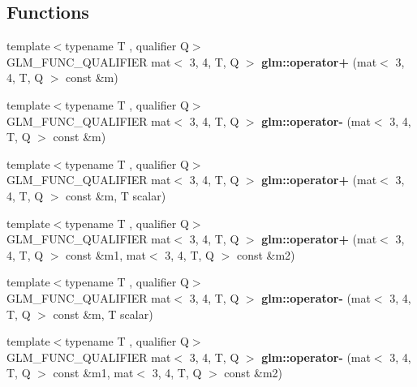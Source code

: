 \subsection*{Functions}
\begin{DoxyCompactItemize}
\item 
\mbox{\label{type__mat3x4_8inl_a80a5567c9ecbbec46155bf07f9d89ac8}} 
{\footnotesize template$<$typename T , qualifier Q$>$ }\\G\+L\+M\+\_\+\+F\+U\+N\+C\+\_\+\+Q\+U\+A\+L\+I\+F\+I\+ER mat$<$ 3, 4, T, Q $>$ {\bfseries glm\+::operator+} (mat$<$ 3, 4, T, Q $>$ const \&m)
\item 
\mbox{\label{type__mat3x4_8inl_a79b94b30ab64f9fb5d7b6ebdaf29adab}} 
{\footnotesize template$<$typename T , qualifier Q$>$ }\\G\+L\+M\+\_\+\+F\+U\+N\+C\+\_\+\+Q\+U\+A\+L\+I\+F\+I\+ER mat$<$ 3, 4, T, Q $>$ {\bfseries glm\+::operator-\/} (mat$<$ 3, 4, T, Q $>$ const \&m)
\item 
\mbox{\label{type__mat3x4_8inl_a1a8b82f43c87f6cfba909facca9c04b7}} 
{\footnotesize template$<$typename T , qualifier Q$>$ }\\G\+L\+M\+\_\+\+F\+U\+N\+C\+\_\+\+Q\+U\+A\+L\+I\+F\+I\+ER mat$<$ 3, 4, T, Q $>$ {\bfseries glm\+::operator+} (mat$<$ 3, 4, T, Q $>$ const \&m, T scalar)
\item 
\mbox{\label{type__mat3x4_8inl_a59ca098cc308f717e9036bbfd62de33f}} 
{\footnotesize template$<$typename T , qualifier Q$>$ }\\G\+L\+M\+\_\+\+F\+U\+N\+C\+\_\+\+Q\+U\+A\+L\+I\+F\+I\+ER mat$<$ 3, 4, T, Q $>$ {\bfseries glm\+::operator+} (mat$<$ 3, 4, T, Q $>$ const \&m1, mat$<$ 3, 4, T, Q $>$ const \&m2)
\item 
\mbox{\label{type__mat3x4_8inl_abd4b7d952364922e319f2c3240a6f799}} 
{\footnotesize template$<$typename T , qualifier Q$>$ }\\G\+L\+M\+\_\+\+F\+U\+N\+C\+\_\+\+Q\+U\+A\+L\+I\+F\+I\+ER mat$<$ 3, 4, T, Q $>$ {\bfseries glm\+::operator-\/} (mat$<$ 3, 4, T, Q $>$ const \&m, T scalar)
\item 
\mbox{\label{type__mat3x4_8inl_a3317241e4c66b496f9578fb97a96dff8}} 
{\footnotesize template$<$typename T , qualifier Q$>$ }\\G\+L\+M\+\_\+\+F\+U\+N\+C\+\_\+\+Q\+U\+A\+L\+I\+F\+I\+ER mat$<$ 3, 4, T, Q $>$ {\bfseries glm\+::operator-\/} (mat$<$ 3, 4, T, Q $>$ const \&m1, mat$<$ 3, 4, T, Q $>$ const \&m2)

\end{DoxyCompactItemize}
